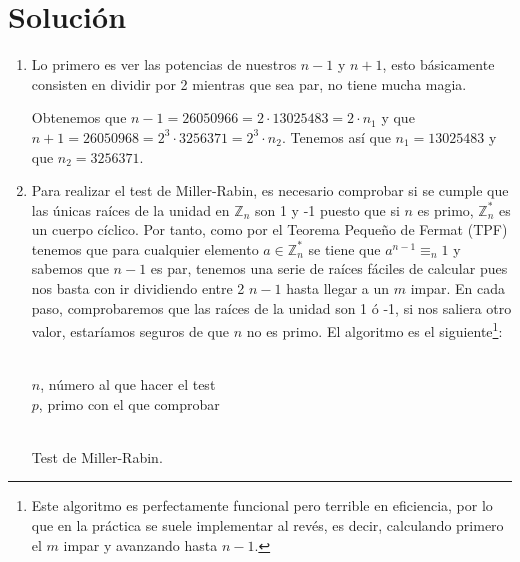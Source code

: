 \section*{Solución}
	\begin{enumerate}
		\item Lo primero es ver las potencias de nuestros $n-1$ y $n+1$, esto básicamente consisten en dividir
		por 2 mientras que sea par, no tiene mucha magia.
		
		Obtenemos que $n-1 = 26050966 = 2 \cdot 13025483 = 2 \cdot n_1$ y que $n+1 = 26050968 = 2^3 \cdot 3256371
		= 2^3 \cdot n_2$. Tenemos así que $n_1 = 13025483$ y que $n_2 = 3256371$.
		
		\item Para realizar el test de Miller-Rabin, es necesario comprobar si se cumple que las únicas raíces de
		la unidad en $\mathbb{Z}_n$ son 1 y -1 puesto que si $n$ es primo, $\mathbb{Z}^*_n$ es un cuerpo cíclico.
		Por tanto, como por el Teorema Pequeño de Fermat (TPF) tenemos que para cualquier elemento $a \in
		\mathbb{Z}^*_n$ se tiene que $a^{n-1} \equiv_n 1$ y sabemos que $n-1$ es par, tenemos una serie de raíces
		fáciles de calcular pues nos basta con ir dividiendo entre 2 $n-1$ hasta llegar a un $m$ impar. En cada
		paso, comprobaremos que las raíces de la unidad son 1 ó -1, si nos saliera otro valor, estaríamos seguros
		de que $n$ no es primo. El algoritmo es el siguiente\footnote{Este algoritmo es perfectamente funcional
		pero terrible en eficiencia, por lo que en la práctica se suele implementar al revés, es decir, calculando
		primero el $m$ impar y avanzando hasta $n-1$.}:
		
		\begin{algorithm}[H]
		\begin{algorithmic}[1]
			\REQUIRE \ \\
				\texttt{$n$}, número al que hacer el test \\
				\texttt{$p$}, primo con el que comprobar \\ \
			\ELSE
					\ENDIF
				\ENDWHILE
					\ELSE
					\ENDIF
				\ENDIF
			\ENDIF
		\end{algorithmic}
		\caption{Test de Miller-Rabin.}
		\label{Miller-Rabin}
		\end{algorithm}
		

\end{enumerate}
